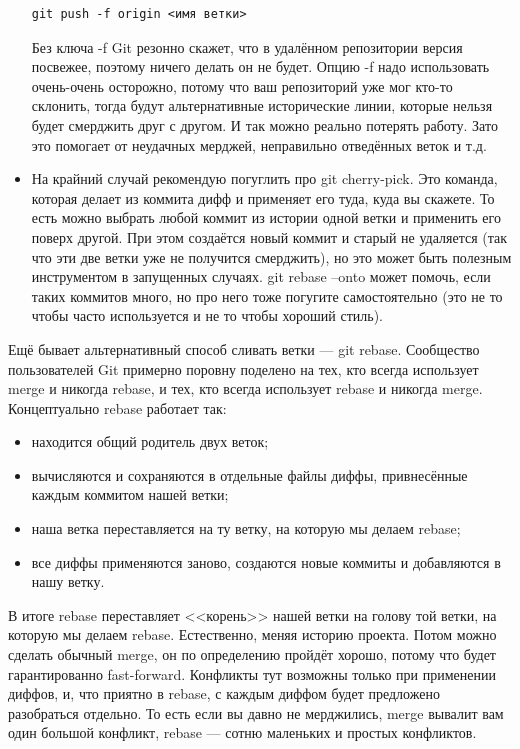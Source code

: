 \documentclass{../text-style}
\begin{document}
\begin{itemize}
\begin{verbatim}
git push -f origin <имя ветки>
        \end{verbatim}
        Без ключа -f Git резонно скажет, что в удалённом репозитории версия посвежее, поэтому ничего делать он не будет. Опцию -f надо использовать очень-очень осторожно, потому что ваш репозиторий уже мог кто-то склонить, тогда будут альтернативные исторические линии, которые нельзя будет смерджить друг с другом. И так можно реально потерять работу. Зато это помогает от неудачных мерджей, неправильно отведённых веток и т.д.
    \item На крайний случай рекомендую погуглить про git cherry-pick. Это команда, которая делает из коммита дифф и применяет его туда, куда вы скажете. То есть можно выбрать любой коммит из истории одной ветки и применить его поверх другой. При этом создаётся новый коммит и старый не удаляется (так что эти две ветки уже не получится смерджить), но это может быть полезным инструментом в запущенных случаях. git rebase --onto может помочь, если таких коммитов много, но про него тоже погугите самостоятельно (это не то чтобы часто используется и не то чтобы хороший стиль).
\end{itemize}

Ещё бывает альтернативный способ сливать ветки --- git rebase. Сообщество пользователей Git примерно поровну поделено на тех, кто всегда использует merge и никогда rebase, и тех, кто всегда использует rebase и никогда merge. Концептуально rebase работает так:

\begin{itemize}
	\item находится общий родитель двух веток;
	\item вычисляются и сохраняются в отдельные файлы диффы, привнесённые каждым коммитом нашей ветки;
	\item наша ветка переставляется на ту ветку, на которую мы делаем rebase;
	\item все диффы применяются заново, создаются новые коммиты и добавляются в нашу ветку.
\end{itemize}

В итоге rebase переставляет <<корень>> нашей ветки на голову той ветки, на которую мы делаем rebase. Естественно, меняя историю проекта. Потом можно сделать обычный merge, он по определению пройдёт хорошо, потому что будет гарантированно fast-forward. Конфликты тут возможны только при применении диффов, и, что приятно в rebase, с каждым диффом будет предложено разобраться отдельно. То есть если вы давно не мерджились, merge вывалит вам один большой конфликт, rebase --- сотню маленьких и простых конфликтов.
\end{document}
